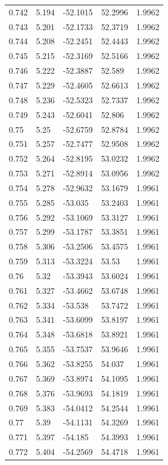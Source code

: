 \begin{tabular}{lllll}
0.742 & 5.194 & -52.1015 & 52.2996 & 1.9962 \\
0.743 & 5.201 & -52.1733 & 52.3719 & 1.9962 \\
0.744 & 5.208 & -52.2451 & 52.4443 & 1.9962 \\
0.745 & 5.215 & -52.3169 & 52.5166 & 1.9962 \\
0.746 & 5.222 & -52.3887 & 52.589 & 1.9962 \\
0.747 & 5.229 & -52.4605 & 52.6613 & 1.9962 \\
0.748 & 5.236 & -52.5323 & 52.7337 & 1.9962 \\
0.749 & 5.243 & -52.6041 & 52.806 & 1.9962 \\
0.75 & 5.25 & -52.6759 & 52.8784 & 1.9962 \\
0.751 & 5.257 & -52.7477 & 52.9508 & 1.9962 \\
0.752 & 5.264 & -52.8195 & 53.0232 & 1.9962 \\
0.753 & 5.271 & -52.8914 & 53.0956 & 1.9962 \\
0.754 & 5.278 & -52.9632 & 53.1679 & 1.9961 \\
0.755 & 5.285 & -53.035 & 53.2403 & 1.9961 \\
0.756 & 5.292 & -53.1069 & 53.3127 & 1.9961 \\
0.757 & 5.299 & -53.1787 & 53.3851 & 1.9961 \\
0.758 & 5.306 & -53.2506 & 53.4575 & 1.9961 \\
0.759 & 5.313 & -53.3224 & 53.53 & 1.9961 \\
0.76 & 5.32 & -53.3943 & 53.6024 & 1.9961 \\
0.761 & 5.327 & -53.4662 & 53.6748 & 1.9961 \\
0.762 & 5.334 & -53.538 & 53.7472 & 1.9961 \\
0.763 & 5.341 & -53.6099 & 53.8197 & 1.9961 \\
0.764 & 5.348 & -53.6818 & 53.8921 & 1.9961 \\
0.765 & 5.355 & -53.7537 & 53.9646 & 1.9961 \\
0.766 & 5.362 & -53.8255 & 54.037 & 1.9961 \\
0.767 & 5.369 & -53.8974 & 54.1095 & 1.9961 \\
0.768 & 5.376 & -53.9693 & 54.1819 & 1.9961 \\
0.769 & 5.383 & -54.0412 & 54.2544 & 1.9961 \\
0.77 & 5.39 & -54.1131 & 54.3269 & 1.9961 \\
0.771 & 5.397 & -54.185 & 54.3993 & 1.9961 \\
0.772 & 5.404 & -54.2569 & 54.4718 & 1.9961 \\

\end{tabular}
